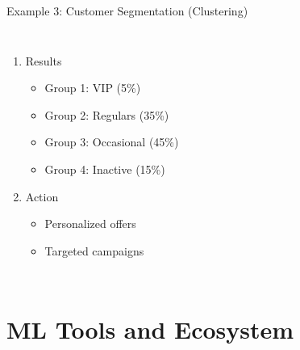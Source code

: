 \documentclass[12pt,aspectratio=169]{beamer}
\begin{document}
\begin{frame}{Example 3: Customer Segmentation (Clustering)}
\begin{columns}[T]
\begin{enumerate}
\item Results
\begin{itemize}
\item Group 1: VIP (5\%)
\item Group 2: Regulars (35\%)
\item Group 3: Occasional (45\%)
\item Group 4: Inactive (15\%)
\end{itemize}
\vspace{-0.2cm}
\item Action
\begin{itemize}
\item Personalized offers
\item Targeted campaigns
\end{itemize}
\end{enumerate}
\end{columns}
\end{frame}

\section{ML Tools and Ecosystem}
\vspace{-0.3cm}
\end{document}
